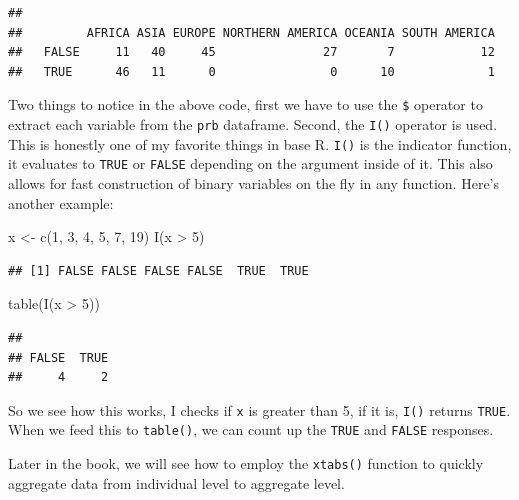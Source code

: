 \documentclass[
]{article}
\newenvironment{Shaded}{\begin{snugshade}}{\end{snugshade}}
\newcommand{\DecValTok}[1]{\textcolor[rgb]{0.00,0.00,0.81}{#1}}
\newcommand{\FunctionTok}[1]{\textcolor[rgb]{0.00,0.00,0.00}{#1}}
\newcommand{\NormalTok}[1]{#1}
\newcommand{\OtherTok}[1]{\textcolor[rgb]{0.56,0.35,0.01}{#1}}
\newcommand{\SpecialCharTok}[1]{\textcolor[rgb]{0.00,0.00,0.00}{#1}}
\begin{document}
\begin{verbatim}
##        
##         AFRICA ASIA EUROPE NORTHERN AMERICA OCEANIA SOUTH AMERICA
##   FALSE     11   40     45               27       7            12
##   TRUE      46   11      0                0      10             1
\end{verbatim}

Two things to notice in the above code, first we have to use the \texttt{\$}
operator to extract each variable from the \texttt{prb} dataframe. Second, the
\texttt{I()} operator is used. This is honestly one of my favorite things in
base R. \texttt{I()} is the indicator function, it evaluates to \texttt{TRUE} or
\texttt{FALSE} depending on the argument inside of it. This also allows for
fast construction of binary variables on the fly in any function. Here's
another example:

\begin{Shaded}
\begin{Highlighting}[]
\NormalTok{x }\OtherTok{\textless{}{-}} \FunctionTok{c}\NormalTok{(}\DecValTok{1}\NormalTok{, }\DecValTok{3}\NormalTok{, }\DecValTok{4}\NormalTok{, }\DecValTok{5}\NormalTok{, }\DecValTok{7}\NormalTok{, }\DecValTok{19}\NormalTok{)}
\FunctionTok{I}\NormalTok{(x }\SpecialCharTok{\textgreater{}} \DecValTok{5}\NormalTok{)}
\end{Highlighting}
\end{Shaded}

\begin{verbatim}
## [1] FALSE FALSE FALSE FALSE  TRUE  TRUE
\end{verbatim}

\begin{Shaded}
\begin{Highlighting}[]
\FunctionTok{table}\NormalTok{(}\FunctionTok{I}\NormalTok{(x }\SpecialCharTok{\textgreater{}} \DecValTok{5}\NormalTok{))}
\end{Highlighting}
\end{Shaded}

\begin{verbatim}
## 
## FALSE  TRUE 
##     4     2
\end{verbatim}

So we see how this works, I checks if \texttt{x} is greater than 5, if it is,
\texttt{I()} returns \texttt{TRUE}. When we feed this to \texttt{table()}, we can count up
the \texttt{TRUE} and \texttt{FALSE} responses.

Later in the book, we will see how to employ the \texttt{xtabs()} function to
quickly aggregate data from individual level to aggregate level.
\end{document}

